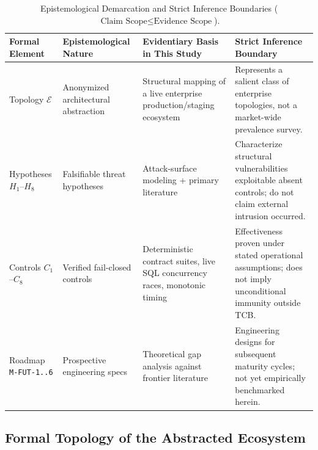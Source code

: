 \documentclass[10pt,twocolumn]{article}
\begin{document}
\begin{table}[t]
\centering
\caption{Epistemological Demarcation and Strict Inference Boundaries ($\text{Claim Scope} \le \text{Evidence Scope}$).}
\label{tab:epistemic}
\footnotesize
\begin{tabularx}{\textwidth}{@{}l l Y Y@{}}
\toprule
\textbf{Formal Element} & \textbf{Epistemological Nature} & \textbf{Evidentiary Basis in This Study} & \textbf{Strict Inference Boundary} \\
\midrule
Topology $\mathcal{E}$ & Anonymized architectural abstraction & Structural mapping of a live enterprise production/staging ecosystem & Represents a salient class of enterprise topologies, not a market-wide prevalence survey. \\
\addlinespace[2pt]
Hypotheses $H_1$--$H_8$ & Falsifiable threat hypotheses & Attack-surface modeling + primary literature~\cite{R01,R15,R22,R25,R26,R28,R29} & Characterize structural vulnerabilities exploitable absent controls; do not claim external intrusion occurred. \\
\addlinespace[2pt]
Controls $C_1$--$C_8$ & Verified fail-closed controls & Deterministic contract suites, live SQL concurrency races, monotonic timing & Effectiveness proven under stated operational assumptions; does not imply unconditional immunity outside TCB. \\
\addlinespace[2pt]
Roadmap \texttt{M-FUT-1..6} & Prospective engineering specs & Theoretical gap analysis against frontier literature~\cite{R07,R08,R13,R16,R20,R27} & Engineering designs for subsequent maturity cycles; not yet empirically benchmarked herein. \\
\bottomrule
\end{tabularx}
\end{table}

\subsection{Formal Topology of the Abstracted Ecosystem}
\end{document}

